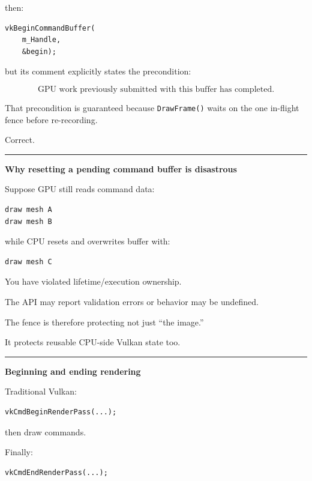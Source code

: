 then:

\begin{verbatim}
vkBeginCommandBuffer(
    m_Handle,
    &begin);
\end{verbatim}

but its comment explicitly states the precondition:

\[
\boxed{
\text{GPU work previously submitted with this buffer has completed}.
}
\]

That precondition is guaranteed because \texttt{DrawFrame()} waits on the one in-flight fence before re-recording.

Correct.

\begin{center}\rule{0.5\linewidth}{0.5pt}\end{center}

\textbf{Why resetting a pending command buffer is disastrous}

Suppose GPU still reads command data:

\begin{verbatim}
draw mesh A
draw mesh B
\end{verbatim}

while CPU resets and overwrites buffer with:

\begin{verbatim}
draw mesh C
\end{verbatim}

You have violated lifetime/execution ownership.

The API may report validation errors or behavior may be undefined.

The fence is therefore protecting not just ``the image.''

It protects reusable CPU-side Vulkan state too.

\begin{center}\rule{0.5\linewidth}{0.5pt}\end{center}

\textbf{Beginning and ending rendering}

Traditional Vulkan:

\begin{verbatim}
vkCmdBeginRenderPass(...);
\end{verbatim}

then draw commands.

Finally:

\begin{verbatim}
vkCmdEndRenderPass(...);
\end{verbatim}

